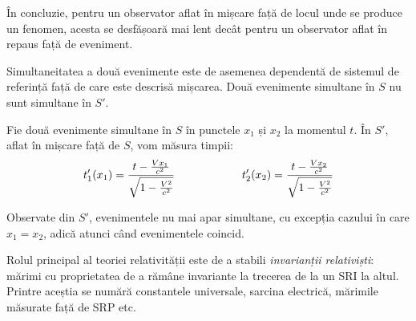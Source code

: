 În concluzie, pentru un observator aflat în mișcare față de locul unde se
produce un fenomen, acesta se desfășoară mai lent decât pentru un observator
aflat în repaus față de eveniment.

Simultaneitatea a două evenimente este de asemenea dependentă de sistemul de
referință față de care este descrisă mișcarea. Două evenimente simultane în
$S$ nu sunt simultane în $S'$.

Fie două evenimente simultane în $S$ în punctele $x_1$ și $x_2$ la momentul
$t$. În $S'$, aflat în mișcare față de $S$, vom măsura timpii:
\begin{equation*}
    \begin{aligned}[t]
        t_1'(x_1) = \frac{t - \frac{Vx_1}{c^2}}{\sqrt{1 - \frac{V^2}{c^2}}}
    \end{aligned}
    \qquad\qquad\qquad
    \begin{aligned}[t]
        t_2'(x_2) = \frac{t - \frac{Vx_2}{c^2}}{\sqrt{1 - \frac{V^2}{c^2}}}
    \end{aligned}
\end{equation*}

Observate din $S'$, evenimentele nu mai apar simultane, cu excepția cazului în
care \( x_1 = x_2 \), adică atunci când evenimentele coincid.

Rolul principal al teoriei relativității este de a stabili
\emph{invarianții relativiști}: mărimi cu proprietatea de a rămâne invariante
la trecerea de la un SRI la altul. Printre aceștia se numără constantele
universale, sarcina electrică, mărimile măsurate față de SRP etc.


